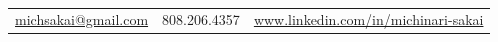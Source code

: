 \documentclass[11pt]{article} %
\begin{document}
\setlength{\parskip}{\baselineskip}%
\pagestyle{empty} %



\begin{center}
	\\%
	\noindent\begin{tabular}{r @{$\quad\bullet\quad$} c @{$\quad\bullet\quad$} l}
		\href{mailto:michsakai@gmail.com}{michsakai@gmail.com} & 808.206.4357 & \href{https://www.linkedin.com/in/michinari-sakai-956b3b156/}{www.linkedin.com/in/michinari-sakai}
	\end{tabular}
\end{center}

%


%
\end{document}
